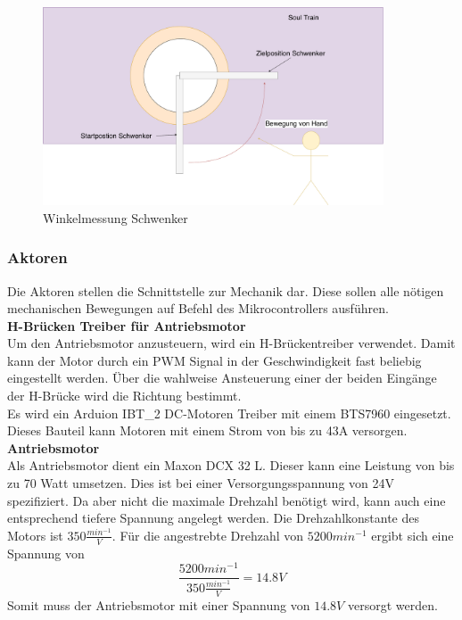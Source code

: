 \documentclass[../../main.tex]{subfiles}
\begin{document}
    \begin{figure}[H]
        \centering
        \includegraphics[width=0.9\textwidth]{../../images/et/et_schwenker_messung.pdf}
        \caption {Winkelmessung Schwenker}
        \label{fig:et_schwenker_messung}
    \end{figure}

    \subsubsection{Aktoren} \label{et_aktoren}
    Die Aktoren stellen die Schnittstelle zur Mechanik dar. Diese sollen alle nötigen mechanischen Bewegungen auf Befehl des Mikrocontrollers ausführen.\\

    \textbf{H-Brücken Treiber für Antriebsmotor}\\
    Um den Antriebsmotor anzusteuern, wird ein H-Brückentreiber verwendet. Damit kann der Motor durch ein PWM Signal in der Geschwindigkeit fast beliebig eingestellt werden. Über die wahlweise Ansteuerung einer der beiden Eingänge der H-Brücke wird die Richtung bestimmt.\\
    Es wird ein Arduion IBT\_2 DC-Motoren Treiber mit einem BTS7960 eingesetzt. Dieses Bauteil kann Motoren mit einem Strom von bis zu 43A versorgen. \\

    \textbf{Antriebsmotor}\\
    Als Antriebsmotor dient ein Maxon DCX 32 L. Dieser kann eine Leistung von bis zu 70 Watt umsetzen. \cite{MaxonDCX32L} Dies ist bei einer Versorgungsspannung von 24V spezifiziert. Da aber nicht die maximale Drehzahl benötigt wird, kann auch eine entsprechend tiefere Spannung angelegt werden. Die Drehzahlkonstante des Motors ist $350 \frac{min^{-1}}{V}$. Für die angestrebte Drehzahl von $5200min^{-1}$ ergibt sich eine Spannung von $$\frac{5200min^{-1}}{350 \frac{min^{-1}}{V}} =14.8V$$ Somit muss der Antriebsmotor mit einer Spannung von $14.8V$ versorgt werden.\\\textbf{\color{red}{TODO:korrekt verwendete Spannung einsetzen!}}
\end{document}
